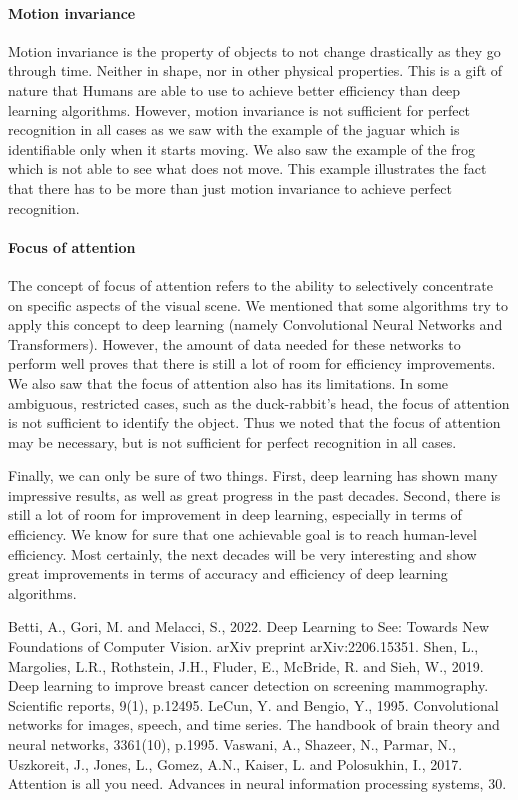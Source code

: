 \documentclass[12pt]{article}
\begin{document}
\paragraph{Motion invariance} Motion invariance is the property of objects to not change drastically as they go through time. Neither in shape, nor in other physical properties. This is a gift of nature that Humans are able to use to achieve better efficiency than deep learning algorithms. However, motion invariance is not sufficient for perfect recognition in all cases as we saw with the example of the jaguar which is identifiable only when it starts moving. We also saw the example of the frog which is not able to see what does not move. This example illustrates the fact that there has to be more than just motion invariance to achieve perfect recognition.
\paragraph{Focus of attention} The concept of focus of attention refers to the ability to selectively concentrate on specific aspects of the visual scene. We mentioned that some algorithms try to apply this concept to deep learning (namely Convolutional Neural Networks and Transformers). However, the amount of data needed for these networks to perform well proves that there is still a lot of room for efficiency improvements. We also saw that the focus of attention also has its limitations. In some ambiguous, restricted cases, such as the duck-rabbit's head, the focus of attention is not sufficient to identify the object. Thus we noted that the focus of attention may be necessary, but is not sufficient for perfect recognition in all cases.

Finally, we can only be sure of two things. First, deep learning has shown many impressive results, as well as great progress in the past decades. Second, there is still a lot of room for improvement in deep learning, especially in terms of efficiency. We know for sure that one achievable goal is to reach human-level efficiency. Most certainly, the next decades will be very interesting and show great improvements in terms of accuracy and efficiency of deep learning algorithms.



\newpage
\begin{thebibliography}{99}
   Betti, A., Gori, M. and Melacci, S., 2022. Deep Learning to See: Towards New Foundations of Computer Vision. arXiv preprint arXiv:2206.15351. 
   Shen, L., Margolies, L.R., Rothstein, J.H., Fluder, E., McBride, R. and Sieh, W., 2019. Deep learning to improve breast cancer detection on screening mammography. Scientific reports, 9(1), p.12495. 
   LeCun, Y. and Bengio, Y., 1995. Convolutional networks for images, speech, and time series. The handbook of brain theory and neural networks, 3361(10), p.1995.
   Vaswani, A., Shazeer, N., Parmar, N., Uszkoreit, J., Jones, L., Gomez, A.N., Kaiser, L. and Polosukhin, I., 2017. Attention is all you need. Advances in neural information processing systems, 30.
\end{thebibliography}
\end{document}

